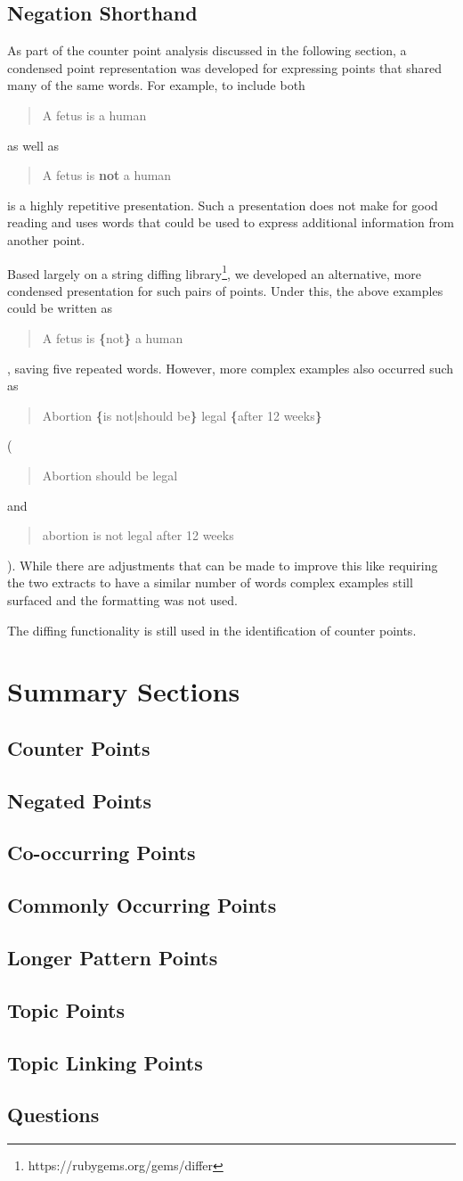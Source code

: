     \subsection{Negation Shorthand}
      As part of the counter point analysis discussed in the following section, a condensed point representation was developed for expressing points that shared many of the same words. For example, to include both \blockquote{A fetus is a human} as well as \blockquote{A fetus is \textbf{not} a human} is a highly repetitive presentation. Such a presentation does not make for good reading and uses words that could be used to express additional information from another point.

      Based largely on a string diffing library\footnote{https://rubygems.org/gems/differ}, we developed an alternative, more condensed presentation for such pairs of points. Under this, the above examples could be written as \blockquote{A fetus is \textbf{\{}not\textbf{\}} a human}, saving five repeated words. However, more complex examples also occurred such as \blockquote{Abortion \textbf{\{}is not\textbf{|}should be\textbf{\}} legal \textbf{\{}after 12 weeks\textbf{\}}} (\blockquote{Abortion should be legal} and \blockquote{abortion is not legal after 12 weeks}). While there are adjustments that can be made to improve this like requiring the two extracts to have a similar number of words complex examples still surfaced and the formatting was not used.

      The diffing functionality is still used in the identification of counter points.

  \section{Summary Sections}
    \subsection{Counter Points}
    \subsection{Negated Points}
    \subsection{Co-occurring Points}
    \subsection{Commonly Occurring Points}
    \subsection{Longer Pattern Points}
    \subsection{Topic Points}
    \subsection{Topic Linking Points}
    \subsection{Questions}
